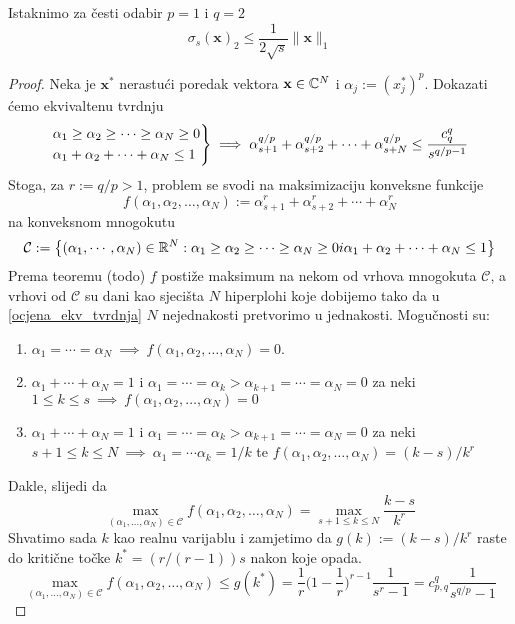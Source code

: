 \documentclass[a4paper,twoside,12pt]{memoir} %
\newcommand{\vect}[1]{\mathbf{#1}}
\renewcommand{\vec}{\vect}
\begin{document}
Istaknimo za \v{c}esti odabir $p=1$ i $q=2$
\begin{equation*}
    \sigma_s(\vec{x})_2 \leq \frac{1}{2\sqrt{s}}\|\vec{x}\|_1
\end{equation*}
\begin{proof}
    Neka je $\vec{x}^*$ nerastu\'ci poredak vektora $\vec{x}\in\C^N$ i $\alpha_j := (x_j^*)^p$. Dokazati \'cemo ekvivaltenu tvrdnju
    \begin{equation}\label{ocjena_ekv_tvrdnja}
    \begin{rcases}
{\alpha_1 \geq \alpha_2 \geq \cdots \geq \alpha_N \geq 0} \\
{\alpha_1 + \alpha_2 + \cdots + \alpha_N \leq 1} 
\end{rcases}\implies \alpha_{s+1}^{q/p} + \alpha_{s+2}^{q/p} + \cdots + \alpha_{s+N}^{q/p} \leq \frac{c^q_{q}}{s^{q/p-1}}
    \end{equation}
    Stoga, za $r:=q/p>1$, problem se svodi na maksimizaciju konveksne funkcije
    $$
    f(\alpha_1, \alpha_2, \dots, \alpha_N) := \alpha_{s+1}^r + \alpha_{s+2}^r + \cdots +\alpha_{N}^r
    $$
    na konveksnom mnogokutu
    $$
    \mathcal{C} := \big\{ (\alpha_1, \cdots, \alpha_N)\in \mathbb{R}^N :  \alpha_1 \geq \alpha_2 \geq \cdots \geq \alpha_N \geq 0 i  \alpha_1 + \alpha_2 + \cdots + \alpha_N \leq 1\big\}
    $$
    Prema teoremu (todo) $f$ posti\v{z}e maksimum na nekom od vrhova mnogokuta $\mathcal{C}$, a vrhovi od $\mathcal{C}$ su dani kao sjeci\v{s}ta  $N$ hiperplohi koje dobijemo tako da u \eqref{ocjena_ekv_tvrdnja} $N$ nejednakosti pretvorimo u jednakosti. Mogu\v{c}nosti su:
    \begin{enumerate}
        \item $\alpha_1=\cdots=\alpha_N \ \implies\  f(\alpha_1, \alpha_2, \dots, \alpha_N) = 0$.
        \item $\alpha_1+\cdots+\alpha_N=1$ i $\alpha_1=\cdots=\alpha_k>\alpha_{k+1}=\cdots=\alpha_N=0$ za neki \\ $1\leq k \leq s \  \implies \  f(\alpha_1, \alpha_2, \dots, \alpha_N) = 0$
        \item $\alpha_1+\cdots+\alpha_N=1$ i $\alpha_1=\cdots=\alpha_k>\alpha_{k+1}=\cdots=\alpha_N=0$ za neki\\ $s+1\leq k \leq N \  \implies \  \alpha_1=\cdots\alpha_k=1/k$ te $f(\alpha_1, \alpha_2, \dots, \alpha_N) = (k-s)/k^r$
    \end{enumerate}
    Dakle, slijedi da 
    $$
    \max\limits_{(\alpha_1,\dots,\alpha_N)\in\mathcal{C}} f(\alpha_1, \alpha_2, \dots, \alpha_N) = \max\limits_{s+1\leq k \leq N} \frac{k-s}{k^r}
    $$
    Shvatimo sada $k$ kao realnu varijablu i zamjetimo da $g(k):=(k-s)/k^r$ raste do kriti\v{c}ne to\v{c}ke $k^*=(r/(r-1))s$ nakon koje opada.
    $$
    \max\limits_{(\alpha_1,\dots,\alpha_N)\in\mathcal{C}} f(\alpha_1, \alpha_2, \dots, \alpha_N) \leq g(k^*) = \frac{1}{r}\bigg( 1- \frac{1}{r}\bigg)^{r-1}\frac{1}{s^r-1}=c^q_{p,q}\frac{1}{s^{q/p}-1}
    $$
\end{proof}
\end{document}
